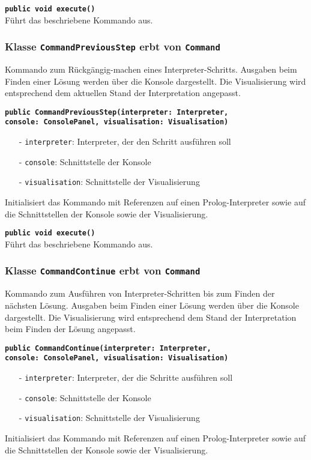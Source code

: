 \documentclass[parskip=full,11pt,twoside]{scrartcl}
\begin{document}
\textbf{\texttt{public void execute()}}\\
Führt das beschriebene Kommando aus.

\subsubsection{Klasse \texttt{CommandPreviousStep} erbt von \texttt{Command}}
Kommando zum Rückgängig-machen eines Interpreter-Schritts. Ausgaben beim Finden einer Lösung werden über die Konsole dargestellt. Die Visualisierung wird entsprechend dem aktuellen Stand der Interpretation angepasst.

\textbf{\texttt{public CommandPreviousStep(interpreter: Interpreter,\\console: ConsolePanel, visualisation: Visualisation)}}\\
\begin{itemize}[noitemsep]
	\item[-] \texttt{interpreter}: Interpreter, der den Schritt ausführen soll
	\item[-] \texttt{console}: Schnittstelle der Konsole
	\item[-] \texttt{visualisation}: Schnittstelle der Visualisierung
\end{itemize}
Initialisiert das Kommando mit Referenzen auf einen Prolog-Interpreter sowie auf die Schnittstellen der Konsole sowie der Visualisierung.

\textbf{\texttt{public void execute()}}\\
Führt das beschriebene Kommando aus.

\subsubsection{Klasse \texttt{CommandContinue} erbt von \texttt{Command}}
Kommando zum Ausführen von Interpreter-Schritten bis zum Finden der nächsten Lösung. Ausgaben beim Finden einer Lösung werden über die Konsole dargestellt. Die Visualisierung wird entsprechend dem Stand der Interpretation beim Finden der Lösung angepasst.

\textbf{\texttt{public CommandContinue(interpreter: Interpreter,\\console: ConsolePanel, visualisation: Visualisation)}}\\
\begin{itemize}[noitemsep]
	\item[-] \texttt{interpreter}: Interpreter, der die Schritte ausführen soll
	\item[-] \texttt{console}: Schnittstelle der Konsole
	\item[-] \texttt{visualisation}: Schnittstelle der Visualisierung
\end{itemize}
Initialisiert das Kommando mit Referenzen auf einen Prolog-Interpreter sowie auf die Schnittstellen der Konsole sowie der Visualisierung.
\end{document}
